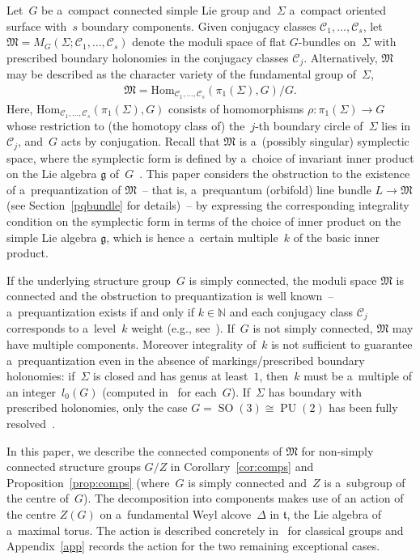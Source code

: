 \documentclass[pdftex]{sigma}
\numberwithin{equation}{section}
\DeclareMathOperator{\SO}{SO}
\DeclareMathOperator{\PU}{PU}
\begin{document}
Let~$G$ be a~compact connected simple Lie group and~$\Sigma$ a~compact oriented surface with~$s$ boundary components.
Given conjugacy classes $\mathcal{C}_1, \ldots, \mathcal{C}_s$, let $\mathfrak{M}=M_G(\Sigma; \mathcal{C}_1, \ldots,
\mathcal{C}_s) $ denote the moduli space of f\/lat $G$-bundles on~$\Sigma$ with prescribed boundary holonomies in the
conjugacy classes $\mathcal{C}_j$.
Alternatively, $\mathfrak{M}$ may be described as the character variety of the fundamental group of~$\Sigma$,
\begin{gather*}
\mathfrak{M} = \mathrm{Hom}_{\mathcal{C}_1, \ldots, \mathcal{C}_s} (\pi_1({\Sigma}),G)/G.
\end{gather*}
Here, $\mathrm{Hom}_{\mathcal{C}_1, \ldots, \mathcal{C}_s} (\pi_1({\Sigma}),G)$ consists of homomorphisms
$\rho:\pi_1({\Sigma}) \to G$ whose restriction to (the homotopy class of) the~$j$-th boundary circle of~$\Sigma$ lies in
$\mathcal{C}_j$, and~$G$ acts by conjugation.
Recall that $\mathfrak{M}$ is a~(possibly singular) symplectic space, where the symplectic form is def\/ined by a~choice
of invariant inner product on the Lie algebra $\mathfrak{g}$ of~$G$~\cite{AB,Go}.
This paper considers the obstruction to the existence of a~prequantization of $\mathfrak{M}$~-- that is, a~prequantum
(orbifold) line bundle $L\to \mathfrak{M}$ (see Section~\ref{pqbundle} for details)~-- by expressing the corresponding
integrality condition on the symplectic form in terms of the choice of inner product on the simple Lie algebra
$\mathfrak{g}$, which is hence a~certain multiple~$k$ of the basic inner product.

If the underlying structure group~$G$ is simply connected, the moduli space $\mathfrak{M}$ is connected and the
obstruction to prequantization is well known~-- a~prequantization exists if and only if $k\in {\mathbb{N}}$ and each
conjugacy class $\mathcal{C}_j$ corresponds to a~level~$k$ weight (e.g., see~\cite{AMW, BL, BasicGerbe}).
If~$G$ is not simply connected, $\mathfrak{M}$ may have multiple components.
Moreover integrality of~$k$ is not suf\/f\/icient to guarantee a~prequantization even in the absence of markings/prescribed
boundary holonomies: if~$\Sigma$ is closed and has genus at least~$1$, then~$k$ must be a~multiple of an integer~$l_0(G)$ (computed in~\cite{JGP} for each~$G$).
If~$\Sigma$ has boundary with prescribed holonomies, only the case $G=\SO(3)\cong \PU(2)$ has been fully
resolved~\cite{KM}.

In this paper, we describe the connected components of $\mathfrak{M}$ for non-simply connected structure groups $G/Z$ in
Corollary~\ref{cor:comps} and Proposition~\ref{prop:comps} (where~$G$ is simply connected and~$Z$ is a~subgroup of the centre of~$G$).
The decomposition into components makes use of an action of the centre $Z(G)$ on a~fundamental Weyl alcove~$\Delta$ in
$\mathfrak{t}$, the Lie algebra of a~maximal torus.
The action is described concretely in~\cite{TL} for classical groups and Appendix~\ref{app} records the action for the
two remaining exceptional cases.
\end{document}
